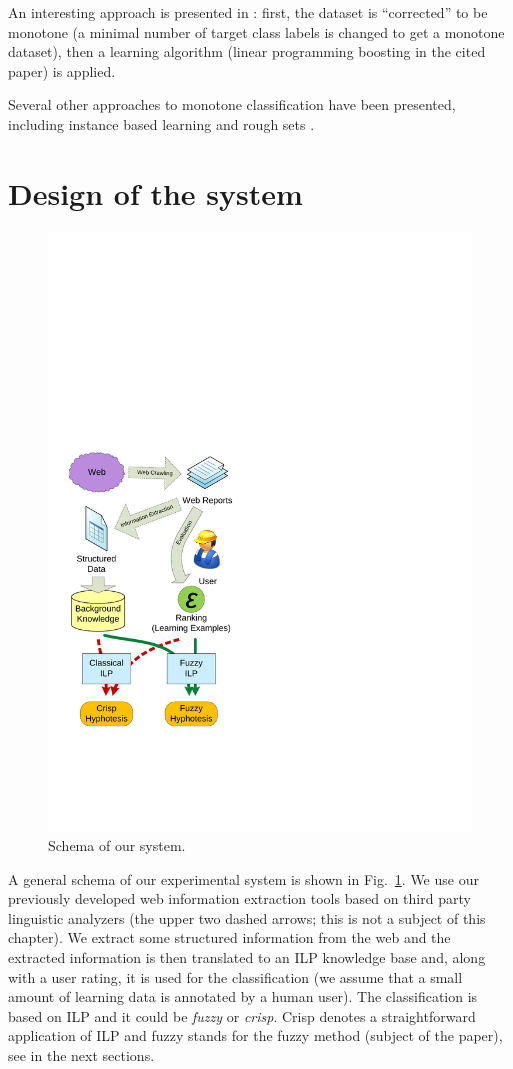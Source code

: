 An interesting approach is presented in \citep{biblio:mon_transf}: first, the dataset is ``corrected'' to be monotone (a minimal number of target class labels is changed to get a monotone dataset), then a learning algorithm (linear programming boosting in the cited paper) is applied.

Several other approaches to monotone classification have been presented, including instance based learning \citep{biblio:ibl} and rough sets \citep{biblio:rough_sets}.





\section{Design of the system} \label{sec:system}
\begin{figure}
\centerline{\includegraphics[width=0.4\hsize]{schema}}
\caption{Schema of our system.}
\label{img:schema}
\end{figure}


A general schema of our experimental system is shown in Fig.~\ref{img:schema}. We use our previously developed web information extraction tools based on third party linguistic analyzers (the upper two dashed arrows; this is not a subject of this chapter). We extract some structured information from the web and the extracted information is then translated to an ILP knowledge base and, along with a user rating, it is used for the classification (we assume that a small amount of learning data is annotated by a human user). The classification is based on ILP and it could be \emph{fuzzy} or \emph{crisp}. Crisp denotes a straightforward application of ILP and fuzzy stands for the fuzzy method (subject of the paper), see in the next sections.



